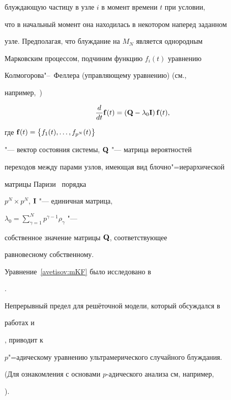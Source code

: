 блуждающую частицу в узле $i$ в момент времени $t$ при условии,

что в начальный момент она находилась в некотором наперед заданном

узле. Предполагая, что блуждание на $M_{N}$ является однородным

Марковским процессом, подчиним функцию $f_{i}(t)$  уравнению

Колмогорова"--~Феллера (управляющему уравнению) (см.,

например,~\cite{avetisov_bikulov_zubarev:bib:VK})

\begin{equation}

\frac{d}{dt}{\bf f}(t)=\left({\bf Q}-\lambda_{0}{\bf I}\right){\bf

f}(t),\label{avetisov:mKF}

\end{equation}

где ${\bf f}(t)=\left\{ f_{1}(t),\ldots,f_{p^{N}}(t)\right\} $

"--- вектор состояния системы, ${\bf Q}$ "--- матрица вероятностей

переходов между парами узлов, имеющая вид блочно"=иерархической

матрицы Паризи~\cite{avetisov_bikulov_zubarev:bib:Parisi2} порядка

$p^{N}\times p^{N}$, ${\bf I}$ "--- единичная матрица,

$\lambda_{0}=\sum_{\gamma=1}^{N}p^{\gamma-1}\rho_{\gamma}$ "---

собственное значение матрицы ${\bf Q}$, соответствующее

равновесному собственному.



Уравнение~\eqref{avetisov:mKF} было исследовано в

\cite{avetisov_bikulov_zubarev:bib:OS,avetisov_bikulov_zubarev:bib:ABK}.

Непрерывный предел для решёточной модели, который обсуждался в

работах \cite{avetisov_bikulov_zubarev:bib:ABK} и

\cite{avetisov_bikulov_zubarev:bib:Parisi1}, приводит к

$p$"=адическому уравнению ультрамерического случайного блуждания.

(Для ознакомления с основами $p$-адического анализа см, например,

\cite{avetisov_bikulov_zubarev:bib:VVZ,avetisov_bikulov_zubarev:bib:Sh}).

